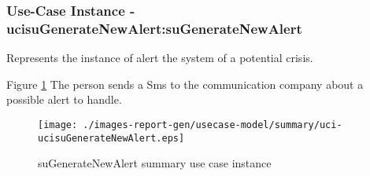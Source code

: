 
	\subsubsection{Use-Case Instance - ucisuGenerateNewAlert:suGenerateNewAlert}
	
	Represents the instance of alert the system of a 
	potential crisis.		  
	\begin{operationmodel}
	
	\end{operationmodel} 

	
	Figure \ref{fig:lu.uni.lassy.excalibur.MyCrash.G02-RE-UC-uci-ucisuGenerateNewAlert}
	The person sends a Sms to the communication company about a possible alert to handle.
	
	\begin{figure}[htbp]
	\begin{center}
	
	\texttt{[image: ./images-report-gen/usecase-model/summary/uci-ucisuGenerateNewAlert.eps]}
	\end{center}
	\caption[lu.uni.lassy.excalibur.MyCrash.G02 Sequence Diagram: uci-ucisuGenerateNewAlert]{suGenerateNewAlert summary use case instance}
	\label{fig:lu.uni.lassy.excalibur.MyCrash.G02-RE-UC-uci-ucisuGenerateNewAlert}
	\end{figure}
	\vspace{0.5cm}
